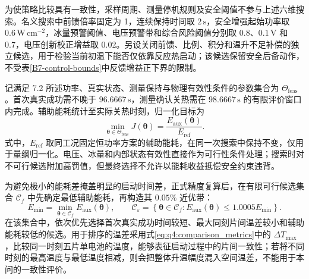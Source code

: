 为使策略比较具有一致性，采样周期、测量停机规则及安全阈值不参与上述六维搜索。名义搜索中前馈倍率固定为 1，连续保持时间取 \(2\,\mathrm s\)，安全增强起始功率取 \(0.6\,\mathrm{W\,cm^{-2}}\)，冰量预警阈值、电压预警带和综合风险阈值分别取 0.8、\(0.1\,\mathrm V\) 和 0.7，电压创新校正增益取 0.02。另设关闭前馈、比例、积分和温升不足补偿的独立候选，用于检验当前初温下能否仅依靠反应热启动；该候选保留安全后备动作，不受表\ref{B7-control-bounds}中反馈增益正下界的限制。

记满足 7.2 所述功率、真实状态、测量保持与物理有效性条件的参数集合为 \(\Theta_{\mathrm{feas}}\)。首次真实成功需不晚于 \(96.6667\,\mathrm s\)，测量确认关热需在 \(98.6667\,\mathrm s\) 的有限评价窗口内完成。辅助能耗统计至实际关热时刻，归一化目标为
\begin{equation}
\min_{\boldsymbol{\theta}\in\Theta_{\mathrm{feas}}}
J(\boldsymbol{\theta})
=\frac{E_{\mathrm{aux}}(\boldsymbol{\theta})}{E_{\mathrm{ref}}}.
\tag{7-@@2@@}\label{eq:q4:solver_objective}
\end{equation}
式中，\(E_{\mathrm{ref}}\) 取同工况固定恒功率方案的辅助能耗，在同一次搜索中保持不变，仅用于量纲归一化。电压、冰量和内部状态有效性直接作为可行性条件处理；搜索时对不可行候选附加高罚值，但最终选择不允许以能耗收益抵偿安全约束违背。

为避免极小的能耗差掩盖明显的启动时间差，正式精度复算后，在有限可行候选集合 \(\mathcal C_f\) 中先确定最低辅助能耗，再构造其 \(0.05\%\) 近优带：
\begin{equation}
E_{\min}=\min_{\boldsymbol{\theta}\in\mathcal C_f}E_{\mathrm{aux}}(\boldsymbol{\theta}),\qquad
\mathcal C_{\varepsilon}=\left\{\boldsymbol{\theta}\in\mathcal C_f:
E_{\mathrm{aux}}(\boldsymbol{\theta})\leq1.0005E_{\min}\right\}.
\tag{7-@@3@@}\label{eq:q4:solver_energy_band}
\end{equation}
在该集合中，依次优先选择首次真实成功时间较短、最大同刻片间温差较小和辅助能耗较低的候选。用于排序的温差采用式\eqref{eq:q4:comparison_metrics}中的 \(\Delta T_{\max}\)，比较同一时刻五片单电池的温度，能够表征启动过程中的片间一致性；若将不同时刻的最高温度与最低温度相减，则会把整体升温幅度混入空间温差，不能用于本问的一致性评价。

